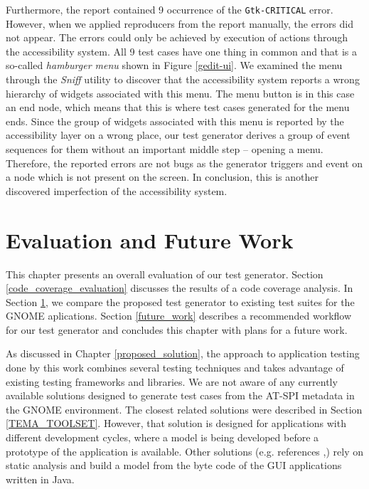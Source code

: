 Furthermore, the report contained 9 occurrence of the \texttt{Gtk-CRITICAL} error. However, when we applied reproducers from the report manually, the errors did not appear. The errors could only be achieved by execution of actions through the accessibility system. All 9 test cases have one thing in common and that is a so-called \textit{hamburger menu} shown in Figure \ref{gedit-ui}. We examined the menu through the \textit{Sniff} utility to discover that the accessibility system reports a wrong hierarchy of widgets associated with this menu. The menu button is in this case an end node, which means that this is where test cases generated for the menu ends. Since the group of widgets associated with this menu is reported by the accessibility layer on a wrong place, our test generator derives a group of event sequences for them without an important middle step -- opening a menu. Therefore, the reported errors are not bugs as the generator triggers and event on a node which is not present on the screen. In conclusion, this is another discovered imperfection of the accessibility system. 



\chapter{Evaluation and Future Work}\label{comparison}
This chapter presents an overall evaluation of our test generator. Section \ref{code_coverage_evaluation} discusses the results of a code coverage analysis. In Section \ref{comparison}, we compare the proposed test generator to existing test suites for the GNOME aplications. Section \ref{future_work} describes a recommended workflow for our test generator and concludes this chapter with plans for a future work. 

As discussed in Chapter \ref{proposed_solution}, the approach to application testing done by this work combines several testing techniques and takes advantage of existing testing frameworks and libraries. We are not aware of any currently available solutions designed to generate test cases from the AT-SPI metadata in the GNOME environment. The closest related solutions were described in Section \ref{TEMA_TOOLSET}. However, that solution is designed for applications with different development cycles, where a model is being developed before a prototype of the application is available. Other solutions (e.g. references \cite{ReisJacinto2018Aetw},\cite{ArltS2012LSAf}) rely on static analysis and build a model from the byte code of the GUI applications written in Java.

